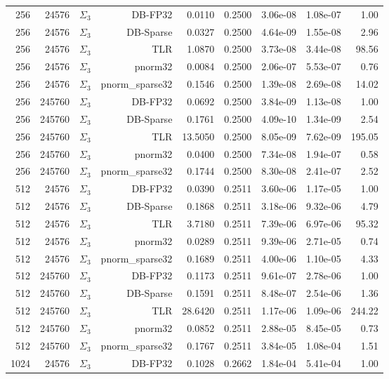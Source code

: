 \begin{tabular}{|r|r|r|r|r|r|r|r|r|}
  256 & 24576 & $\Sigma_3$ & DB-FP32 & 0.0110 & 0.2500 & 3.06e-08 & 1.08e-07 & 1.00 \\
  256 & 24576 & $\Sigma_3$ & DB-Sparse & 0.0327 & 0.2500 & 4.64e-09 & 1.55e-08 & 2.96 \\
  256 & 24576 & $\Sigma_3$ & TLR & 1.0870 & 0.2500 & 3.73e-08 & 3.44e-08 & 98.56 \\
  256 & 24576 & $\Sigma_3$ & pnorm32 & 0.0084 & 0.2500 & 2.06e-07 & 5.53e-07 & 0.76 \\
  256 & 24576 & $\Sigma_3$ & pnorm\_sparse32 & 0.1546 & 0.2500 & 1.39e-08 & 2.69e-08 & 14.02 \\
  256 & 245760 & $\Sigma_3$ & DB-FP32 & 0.0692 & 0.2500 & 3.84e-09 & 1.13e-08 & 1.00 \\
  256 & 245760 & $\Sigma_3$ & DB-Sparse & 0.1761 & 0.2500 & 4.09e-10 & 1.34e-09 & 2.54 \\
  256 & 245760 & $\Sigma_3$ & TLR & 13.5050 & 0.2500 & 8.05e-09 & 7.62e-09 & 195.05 \\
  256 & 245760 & $\Sigma_3$ & pnorm32 & 0.0400 & 0.2500 & 7.34e-08 & 1.94e-07 & 0.58 \\
  256 & 245760 & $\Sigma_3$ & pnorm\_sparse32 & 0.1744 & 0.2500 & 8.30e-08 & 2.41e-07 & 2.52 \\
  512 & 24576 & $\Sigma_3$ & DB-FP32 & 0.0390 & 0.2511 & 3.60e-06 & 1.17e-05 & 1.00 \\
  512 & 24576 & $\Sigma_3$ & DB-Sparse & 0.1868 & 0.2511 & 3.18e-06 & 9.32e-06 & 4.79 \\
  512 & 24576 & $\Sigma_3$ & TLR & 3.7180 & 0.2511 & 7.39e-06 & 6.97e-06 & 95.32 \\
  512 & 24576 & $\Sigma_3$ & pnorm32 & 0.0289 & 0.2511 & 9.39e-06 & 2.71e-05 & 0.74 \\
  512 & 24576 & $\Sigma_3$ & pnorm\_sparse32 & 0.1689 & 0.2511 & 4.00e-06 & 1.10e-05 & 4.33 \\
  512 & 245760 & $\Sigma_3$ & DB-FP32 & 0.1173 & 0.2511 & 9.61e-07 & 2.78e-06 & 1.00 \\
  512 & 245760 & $\Sigma_3$ & DB-Sparse & 0.1591 & 0.2511 & 8.48e-07 & 2.54e-06 & 1.36 \\
  512 & 245760 & $\Sigma_3$ & TLR & 28.6420 & 0.2511 & 1.17e-06 & 1.09e-06 & 244.22 \\
  512 & 245760 & $\Sigma_3$ & pnorm32 & 0.0852 & 0.2511 & 2.88e-05 & 8.45e-05 & 0.73 \\
  512 & 245760 & $\Sigma_3$ & pnorm\_sparse32 & 0.1767 & 0.2511 & 3.84e-05 & 1.08e-04 & 1.51 \\
  1024 & 24576 & $\Sigma_3$ & DB-FP32 & 0.1028 & 0.2662 & 1.84e-04 & 5.41e-04 & 1.00 \\

\end{tabular}
